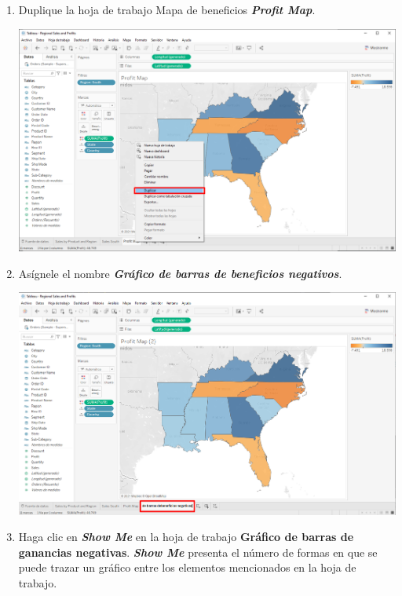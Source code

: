 \documentclass[12pt,letterpaper]{article}
\begin{document}
    \begin{enumerate}
        \item Duplique la hoja de trabajo Mapa de beneficios \textit{\textbf{Profit Map}}.
        \begin{center}
            \includegraphics[width=15cm]{./img/img41.png}
        \end{center}
        \item Asígnele el nombre \textit{\textbf{Gráfico de barras de beneficios negativos}}.
        \begin{center}
            \includegraphics[width=15cm]{./img/img42.png}
        \end{center}
        \item Haga clic en \textit{\textbf{Show Me}} en la hoja de trabajo \textbf{Gráfico de barras de ganancias negativas}. \textit{\textbf{Show Me}} presenta el número de formas en que se puede trazar un gráfico entre los elementos mencionados en la hoja de trabajo.
        \begin{center}

\end{center}
\end{enumerate}
\end{document}
